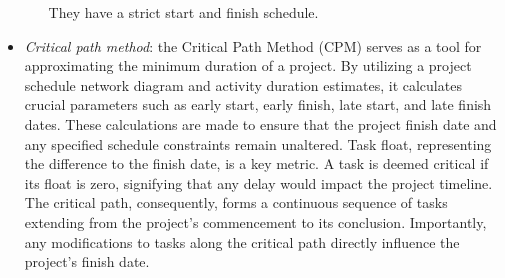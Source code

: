 \begin{itemize}
\begin{itemize}
                They have a strict start and finish schedule.
        \end{itemize}
    \item \textit{Critical path method}: the Critical Path Method (CPM) serves as a tool for approximating the minimum duration of a project. 
        By utilizing a project schedule network diagram and activity duration estimates, it calculates crucial parameters such as early start, early finish, late start, and late finish dates. 
        These calculations are made to ensure that the project finish date and any specified schedule constraints remain unaltered.
        Task float, representing the difference to the finish date, is a key metric. 
        A task is deemed critical if its float is zero, signifying that any delay would impact the project timeline. 
        The critical path, consequently, forms a continuous sequence of tasks extending from the project's commencement to its conclusion. 
        Importantly, any modifications to tasks along the critical path directly influence the project's finish date.
\end{itemize}





















